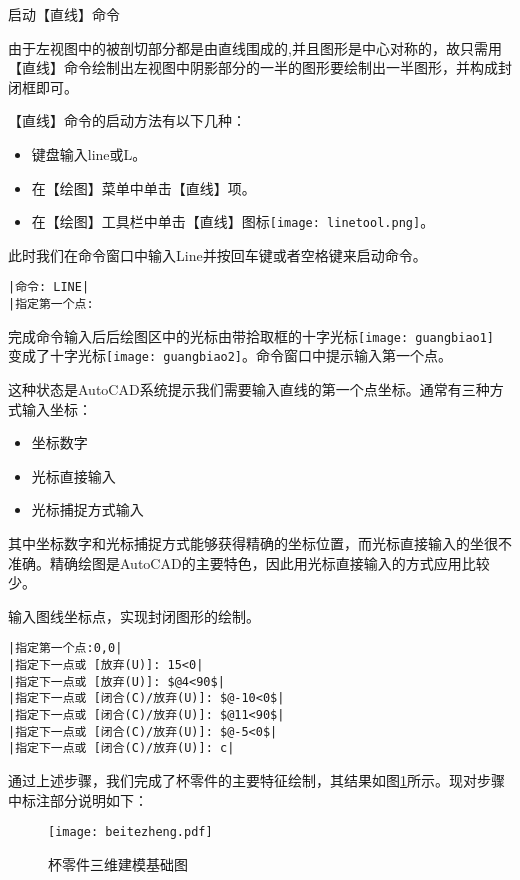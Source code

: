 \begin{procedure}
\item 启动【直线】命令

由于左视图中的被剖切部分都是由直线围成的,并且图形是中心对称的，故只需用【直线】命令绘制出左视图中阴影部分的一半的图形要绘制出一半图形，并构成封闭框即可。

【直线】命令的启动方法有以下几种：
\begin{itemize}
\item 键盘输入line或L。
\item 在【绘图】菜单中单击【直线】项。
\item 在【绘图】工具栏中单击【直线】图标\texttt{[image: linetool.png]}。
\end{itemize}
此时我们在命令窗口中输入Line并按回车键或者空格键来启动命令。
\begin{lstlisting}
|命令: LINE|
|指定第一个点:
\end{lstlisting}
完成命令输入后后绘图区中的光标由带拾取框的十字光标\texttt{[image: guangbiao1]} 变成了十字光标\texttt{[image: guangbiao2]}。命令窗口中提示输入第一个点。

这种状态是AutoCAD系统提示我们需要输入直线的第一个点坐标。通常有三种方式输入坐标：
\begin{itemize}
\item 坐标数字
\item 光标直接输入
\item 光标捕捉方式输入
\end{itemize}

其中坐标数字和光标捕捉方式能够获得精确的坐标位置，而光标直接输入的坐很不准确。精确绘图是AutoCAD的主要特色，因此用光标直接输入的方式应用比较少。
\item 输入图线坐标点，实现封闭图形的绘制。

\begin{lstlisting}
|指定第一个点:0,0|
|指定下一点或 [放弃(U)]: 15<0|
|指定下一点或 [放弃(U)]: $@4<90$|
|指定下一点或 [闭合(C)/放弃(U)]: $@-10<0$|
|指定下一点或 [闭合(C)/放弃(U)]: $@11<90$|
|指定下一点或 [闭合(C)/放弃(U)]: $@-5<0$|
|指定下一点或 [闭合(C)/放弃(U)]: c|
\end{lstlisting}

通过上述步骤，我们完成了杯零件的主要特征绘制，其结果如图\ref{fig:bettezheng}所示。现对步骤中标注部分说明如下：
\noindent
\begin{figure}[htbp]
\centering
\texttt{[image: beitezheng.pdf]}
\caption{杯零件三维建模基础图}\label{fig:bettezheng}
\end{figure}
\end{procedure}

